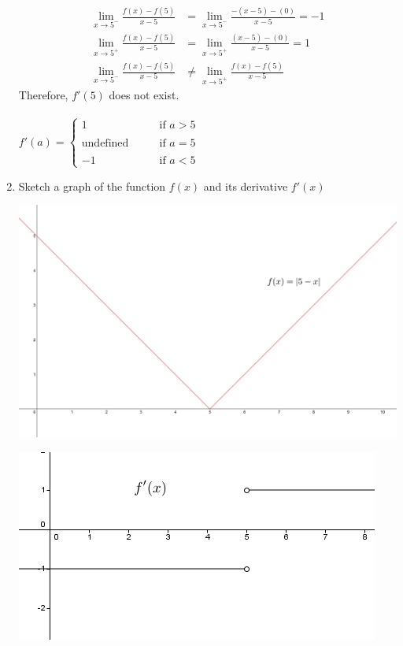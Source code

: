 \documentclass[nooutcomes]{ximera}
\begin{document}
\begin{problem}
\begin{enumerate}
\begin{freeResponse}
		\begin{align*}
		\lim_{x \to 5^-} \frac{f(x) - f(5)}{x-5}&=\lim_{x \to 5^-} \frac{-(x-5) - (0)}{x-5}=-1\\
		\lim_{x \to 5^+} \frac{f(x) - f(5)}{x-5}&=\lim_{x \to 5^+} \frac{(x-5) - (0)}{x-5}=1\\
		\lim_{x \to 5^-} \frac{f(x) - f(5)}{x-5} &\ne\lim_{x \to 5^+} \frac{f(x) - f(5)}{x-5}
		\end{align*}
		Therefore, $f'(5)$ does not exist.\\\\
			$f'(a) =   \left\{ \begin{array}{cl}
	1	 	&	\qquad \text{if } a>5					\\ \\
	\text{undefined}	&	\qquad \text{if } a=5	\\ \\
	-1			&	\qquad \text{if } a<5				\end{array} \right.  $
		\end{freeResponse}
		
	\item Sketch a graph of the function $f(x)$ and its derivative $f'(x)$

		\begin{freeResponse} \hfil
\begin{image}
\includegraphics[scale = .3]{Figure12.png}
\end{image} 
\begin{image}
\includegraphics[scale = .9]{Figure13.png}
\end{image} 
		\end{freeResponse}

	\end{enumerate}


\end{problem}	
	
	
\end{document}
